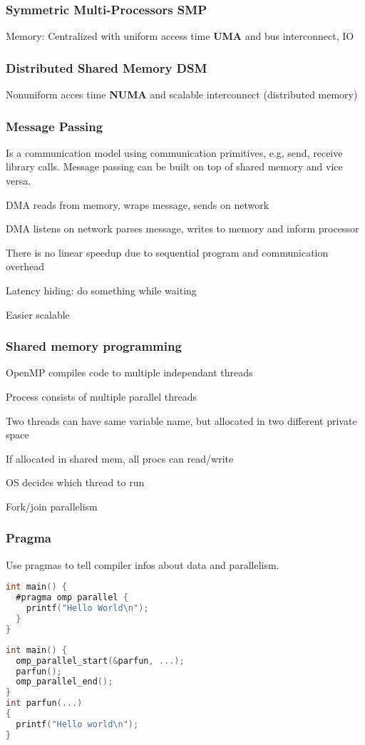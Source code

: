 \documentclass[a4paper, fontsize=8pt, landscape, DIV=1]{scrartcl}
\makeatletter
\renewenvironment{outline}[1][]{%
  \ifthenelse{\equal{#1}{}}{}{\renewcommand{\ol@type}{#1}}%
  \ol@z%
  \newcommand{\0}{\ol@toz\ol@z}%
  \newcommand{\1}{\vspace{\dimexpr\outlinespacingscalar\baselineskip-\baselineskip}\ol@toi\ol@i\item}%
  \newcommand{\2}{\vspace{\dimexpr\outlinespacingscalartwo\baselineskip-\baselineskip}\ol@toii\ol@ii\item}%
  \newcommand{\3}{\vspace{\dimexpr\outlinespacingscalar\baselineskip-\baselineskip}\ol@toiii\ol@iii\item}%
  \newcommand{\4}{\vspace{\dimexpr\outlinespacingscalar\baselineskip-\baselineskip}\ol@toiiii\ol@iiii\item}%
}{%
  \ol@toz\ol@exit%
}
\def\outlinespacingscalar{0.5}
\def\outlinespacingscalartwo{0.5}
\makeatother
\begin{document}
\begin{multicols*}{4}
  \subsubsection{Symmetric Multi-Processors SMP}
  Memory: Centralized with uniform access time \textbf{UMA} and bus interconnect, IO

  \subsubsection{Distributed Shared Memory DSM}
  Nonuniform acces time \textbf{NUMA} and scalable interconnect (distributed memory)

  \subsubsection{Message Passing}
  Is a communication model using communication primitives, e.g, send, receive library calls.
  Message passing can be built on top of shared memory and vice versa.

  \begin{outline}
    \1 DMA reads from memory, wraps message, sends on network
    \1 DMA listens on network parses message, writes to memory and inform processor
    \1 There is no linear speedup due to sequential program and communication overhead
    \1 Latency hiding: do something while waiting
    \1 Easier scalable
  \end{outline}

  \subsubsection{Shared memory programming}
  \begin{outline}
    \1 OpenMP compiles code to multiple independant threads
    \1 Process consists of multiple parallel threads
    \1 Two threads can have same variable name, but allocated in two different private space
    \1 If allocated in shared mem, all procs can read/write
    \1 OS decides which thread to run
    \1 Fork/join parallelism
  \end{outline}

  \subsubsection{Pragma}
  Use pragmas to tell compiler infos about data and parallelism.
  \begin{lstlisting}[language=C]
int main() {
  #pragma omp parallel {
    printf("Hello World\n");
  }
}\end{lstlisting}
  \begin{lstlisting}[language=C]
int main() {
  omp_parallel_start(&parfun, ...);
  parfun();
  omp_parallel_end();
}
int parfun(...)
{
  printf("Hello world\n");
}\end{lstlisting}


\end{multicols*}
\end{document}
